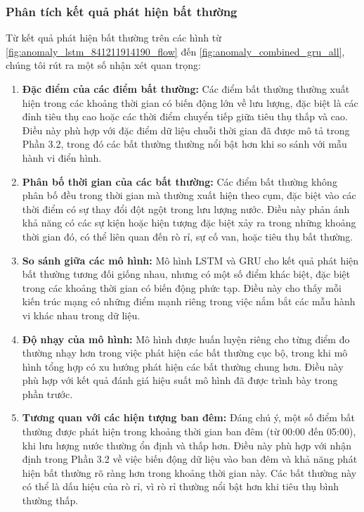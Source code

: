 \subsubsection{Phân tích kết quả phát hiện bất thường}

Từ kết quả phát hiện bất thường trên các hình từ \ref{fig:anomaly_lstm_841211914190_flow} đến \ref{fig:anomaly_combined_gru_all}, chúng tôi rút ra một số nhận xét quan trọng:

\begin{enumerate}
    \item \textbf{Đặc điểm của các điểm bất thường:} Các điểm bất thường thường xuất hiện trong các khoảng thời gian có biến động lớn về lưu lượng, đặc biệt là các đỉnh tiêu thụ cao hoặc các thời điểm chuyển tiếp giữa tiêu thụ thấp và cao. Điều này phù hợp với đặc điểm dữ liệu chuỗi thời gian đã được mô tả trong Phần 3.2, trong đó các bất thường thường nổi bật hơn khi so sánh với mẫu hành vi điển hình.
    
    \item \textbf{Phân bố thời gian của các bất thường:} Các điểm bất thường không phân bố đều trong thời gian mà thường xuất hiện theo cụm, đặc biệt vào các thời điểm có sự thay đổi đột ngột trong lưu lượng nước. Điều này phản ánh khả năng có các sự kiện hoặc hiện tượng đặc biệt xảy ra trong những khoảng thời gian đó, có thể liên quan đến rò rỉ, sự cố van, hoặc tiêu thụ bất thường.
    
    \item \textbf{So sánh giữa các mô hình:} Mô hình LSTM và GRU cho kết quả phát hiện bất thường tương đối giống nhau, nhưng có một số điểm khác biệt, đặc biệt trong các khoảng thời gian có biến động phức tạp. Điều này cho thấy mỗi kiến trúc mạng có những điểm mạnh riêng trong việc nắm bắt các mẫu hành vi khác nhau trong dữ liệu.
    
    \item \textbf{Độ nhạy của mô hình:} Mô hình được huấn luyện riêng cho từng điểm đo thường nhạy hơn trong việc phát hiện các bất thường cục bộ, trong khi mô hình tổng hợp có xu hướng phát hiện các bất thường chung hơn. Điều này phù hợp với kết quả đánh giá hiệu suất mô hình đã được trình bày trong phần trước.
    
    \item \textbf{Tương quan với các hiện tượng ban đêm:} Đáng chú ý, một số điểm bất thường được phát hiện trong khoảng thời gian ban đêm (từ 00:00 đến 05:00), khi lưu lượng nước thường ổn định và thấp hơn. Điều này phù hợp với nhận định trong Phần 3.2 về việc biến động dữ liệu vào ban đêm và khả năng phát hiện bất thường rõ ràng hơn trong khoảng thời gian này. Các bất thường này có thể là dấu hiệu của rò rỉ, vì rò rỉ thường nổi bật hơn khi tiêu thụ bình thường thấp.
\end{enumerate}

